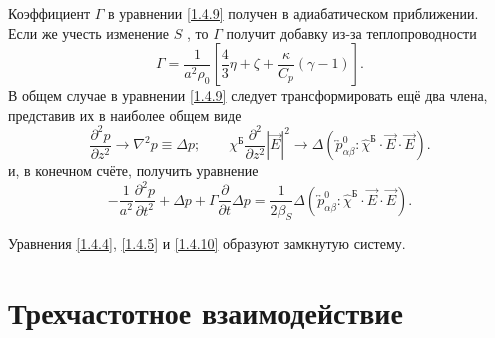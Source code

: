 \documentclass[a4paper]{article}
\begin{document}
Коэффициент $\Gamma$  в уравнении \eqref{1.4.9} получен в адиабатическом приближении. Если же учесть изменение $S$ , то $\Gamma$  получит добавку из-за теплопроводности
\begin{equation}
	\Gamma=\frac{1}{a^{2}\rho_{0}}\left[\frac{4}{3}\eta+\zeta+\frac{\kappa}{C_{p}}(\gamma-1)\right].
	\tag{*}\label{1.4.*2}
\end{equation}
В общем случае в уравнении \eqref{1.4.9} следует трансформировать ещё два члена, представив их в наиболее общем виде
\begin{equation}
	\frac{\partial^{2}p}{\partial z^{2}}\rightarrow\nabla^{2}p\equiv\Delta p;\qquad\chi^{\text{Б}}\frac{\partial^{2}}{\partial z^{2}}\left|\vec{E}\right|^{2}\rightarrow\Delta(\overleftrightarrow{p}^{0}_{\alpha\beta}:\hat{\chi}^{\text{Б}}\cdot\vec{E}\cdot\vec{E}).
	\tag{**}
	\label{1.4.**2}
\end{equation}
и, в конечном счёте, получить уравнение 
\begin{equation}
	-\frac{1}{a^{2}}\frac{\partial^{2}p}{\partial t^{2}}+\Delta p+\Gamma\frac{\partial}{\partial t}\Delta p=\frac{1}{2\beta_{S}}\Delta(\overleftrightarrow{p}^{0}_{\alpha\beta}:\hat{\chi}^{\text{Б}}\cdot\vec{E}\cdot\vec{E}).
	\label{1.4.10}
\end{equation}

Уравнения \eqref{1.4.4}, \eqref{1.4.5} и \eqref{1.4.10} образуют замкнутую систему.
\section{Трехчастотное взаимодействие}
\end{document}
